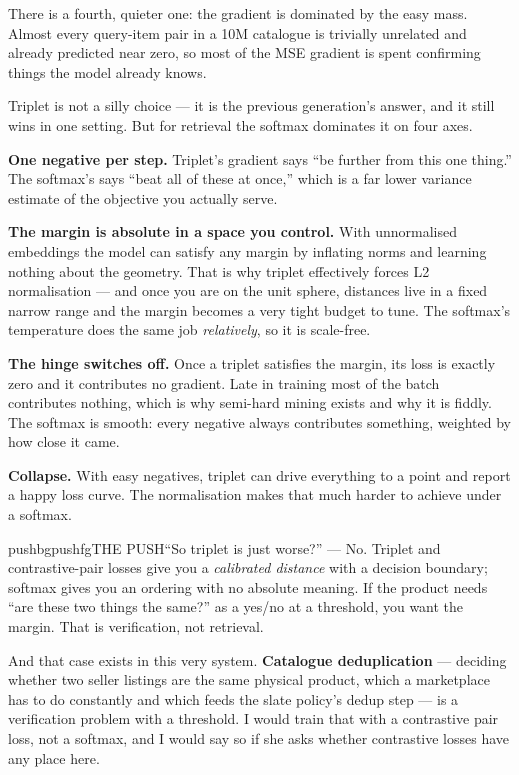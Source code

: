 \documentclass[10pt,twoside]{book}
\makeatletter
\newcommand{\csubsection}[1]{\par\vspace{9pt}\noindent{\sffamily\normalsize\bfseries\color{accent}\raggedright #1\par}\vspace{2pt}}
\newenvironment{calloutpush}{\begin{co@box}{pushbg}{pushfg}{THE PUSH}}{\end{co@box}}
\makeatother
\begin{document}
There is a fourth, quieter one: the gradient is dominated by the easy mass. Almost every query-item pair in a 10M catalogue is trivially unrelated and already predicted near zero, so most of the MSE gradient is spent confirming things the model already knows.\par
\csubsection{Why not triplet, and when it is actually right}
Triplet is not a silly choice --- it is the previous generation's answer, and it still wins in one setting. But for retrieval the softmax dominates it on four axes.\par
\textbf{One negative per step.} Triplet's gradient says ``be further from this one thing.'' The softmax's says ``beat all of these at once,'' which is a far lower variance estimate of the objective you actually serve.\par
\textbf{The margin is absolute in a space you control.} With unnormalised embeddings the model can satisfy any margin by inflating norms and learning nothing about the geometry. That is why triplet effectively forces L2 normalisation --- and once you are on the unit sphere, distances live in a fixed narrow range and the margin becomes a very tight budget to tune. The softmax's temperature does the same job \textit{relatively}, so it is scale-free.\par
\textbf{The hinge switches off.} Once a triplet satisfies the margin, its loss is exactly zero and it contributes no gradient. Late in training most of the batch contributes nothing, which is why semi-hard mining exists and why it is fiddly. The softmax is smooth: every negative always contributes something, weighted by how close it came.\par
\textbf{Collapse.} With easy negatives, triplet can drive everything to a point and report a happy loss curve. The normalisation makes that much harder to achieve under a softmax.\par
\begin{calloutpush}``So triplet is just worse?'' --- No. Triplet and contrastive-pair losses give you a \textit{calibrated distance} with a decision boundary; softmax gives you an ordering with no absolute meaning. If the product needs ``are these two things the same?'' as a yes/no at a threshold, you want the margin. That is verification, not retrieval.\end{calloutpush}
And that case exists in this very system. \textbf{Catalogue deduplication} --- deciding whether two seller listings are the same physical product, which a marketplace has to do constantly and which feeds the slate policy's dedup step --- is a verification problem with a threshold. I would train that with a contrastive pair loss, not a softmax, and I would say so if she asks whether contrastive losses have any place here.\par
\end{document}
